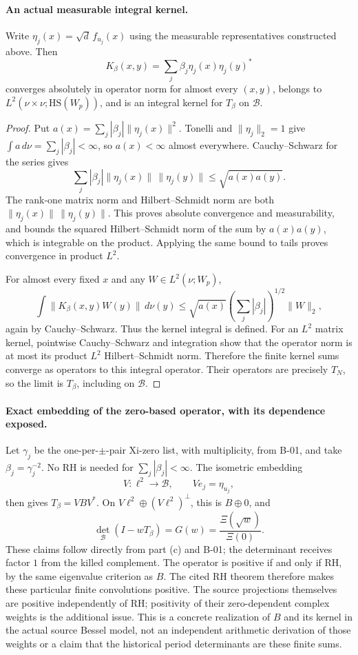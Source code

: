 \documentclass[11pt,a4paper]{article}
\newcommand{\fid}[1]{\textsf{#1}}
\begin{document}
\paragraph{An actual measurable integral kernel.}
Write \(\eta_j(x)=\sqrt d\,f_{u_j}(x)\) using the measurable
representatives constructed above. Then
\[
 K_\beta(x,y)=\sum_j\beta_j\eta_j(x)\eta_j(y)^*
\]
converges absolutely in operator norm for almost every \((x,y)\),
belongs to \(L^2(\nu\times\nu;\mathrm{HS}(W_p))\), and is an
integral kernel for \(T_\beta\) on \(\mathcal B\).
\begin{proof}
Put \(a(x)=\sum_j|\beta_j|\|\eta_j(x)\|^2\).
Tonelli and \(\|\eta_j\|_2=1\) give
\(\int a\,d\nu=\sum_j|\beta_j|<\infty\), so \(a(x)<\infty\)
almost everywhere. Cauchy--Schwarz for the series gives
\[
 \sum_j|\beta_j|\|\eta_j(x)\|\,\|\eta_j(y)\|
 \le\sqrt{a(x)a(y)}.
\]
The rank-one matrix norm and Hilbert--Schmidt norm are both
\(\|\eta_j(x)\|\,\|\eta_j(y)\|\).
This proves absolute convergence and measurability, and bounds
the squared Hilbert--Schmidt norm of the sum by \(a(x)a(y)\),
which is integrable on the product. Applying the same bound
to tails proves convergence in product \(L^2\).

For almost every fixed \(x\) and any \(W\in L^2(\nu;W_p)\),
\[
 \int\|K_\beta(x,y)W(y)\|\,d\nu(y)
 \le\sqrt{a(x)}\left(\sum_j|\beta_j|\right)^{1/2}\|W\|_2,
\]
again by Cauchy--Schwarz. Thus the kernel integral is defined.
For an \(L^2\) matrix kernel, pointwise Cauchy--Schwarz and
integration show that the operator norm is at most its
product \(L^2\) Hilbert--Schmidt norm. Therefore the finite
kernel sums converge as operators to this integral operator.
Their operators are precisely \(T_N\), so the limit is
\(T_\beta\), including on \(\mathcal B\).
\end{proof}

\paragraph{Exact embedding of the zero-based operator, with its dependence exposed.}
Let \(\gamma_j\) be the one-per-\(\pm\)-pair Xi-zero list, with
multiplicity, from \fid{B-01}, and take
\(\beta_j=\gamma_j^{-2}\).
No RH is needed for \(\sum_j|\beta_j|<\infty\).
The isometric embedding
\[
 V:\ell^2\longrightarrow\mathcal B,\qquad
 Ve_j=\eta_{u_j},
\]
then gives \(T_\beta=VBV^*\). On
\(V\ell^2\oplus(V\ell^2)^\perp\), this is \(B\oplus0\), and
\[
 \det_{\mathcal B}(I-wT_\beta)=G(w)
 =\frac{\Xi(\sqrt w)}{\Xi(0)}.
\]
These claims follow directly from part (c) and \fid{B-01};
the determinant receives factor \(1\) from the killed complement.
The operator is positive if and only if RH, by the same
eigenvalue criterion as \(B\). The cited RH theorem therefore
makes these particular finite convolutions positive.
The source projections themselves are positive independently
of RH; positivity of their zero-dependent complex weights is
the additional issue. This is a concrete realization of \(B\)
and its kernel in the actual source Bessel model, not an
independent arithmetic derivation of those weights or a claim
that the historical period determinants are these finite sums.
\end{document}
